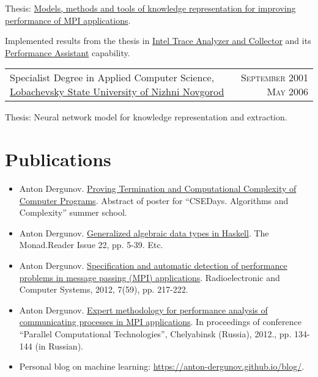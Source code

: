 \documentclass{article}
\makeatletter
\newcommand{\whatwherewhen}[3]{
\noindent\begin{tabular*}{\columnwidth}{@{}@{\extracolsep{\fill}}lr@{}}
#1, #2 & \textsc{#3}
\end{tabular*}}
\newcommand{\smallvskip}{\vskip2mm}
\makeatother
\begin{document}
Thesis: \href{https://search.rsl.ru/ru/record/01005013870}{Models, methods and tools of knowledge representation for improving performance of MPI applications}. 

Implemented results from the thesis in \href{http://software.intel.com/en-us/intel-trace-analyzer}{Intel Trace Analyzer and Collector} and its \href{https://web.archive.org/web/20151022144828/https://software.intel.com/en-us/node/561522}{Performance Assistant} capability.

\smallvskip
\whatwherewhen{Specialist Degree in Applied Computer Science}{\href{http://unn.ru}{Lobachevsky State University of Nizhni Novgorod}}{September 2001 \textendash{} May 2006}

Thesis: Neural network model for knowledge representation and extraction.


\section{Publications}

\begin{itemize}
\item Anton Dergunov. \href{http://anton-dergunov.github.io/publications/proving_complexity_v2.pdf}{Proving Termination and Computational Complexity of Computer Programs}. Abstract of poster for ``CSEDays. Algorithms and Complexity'' summer school.
\item Anton Dergunov. \href{http://themonadreader.files.wordpress.com/2013/08/issue221.pdf}{Generalized algebraic data types in Haskell}. The Monad.Reader Issue 22, pp. 5-39. Etc.
\item Anton Dergunov. \href{http://anton-dergunov.ru/publications/mpi_performance.pdf}{Specification and automatic detection of performance problems in message passing (MPI) applications}. Radioelectronic and Computer Systems, 2012, 7(59), pp. 217-222.
\item Anton Dergunov. \href{https://anton-dergunov.github.io/publications/expert_methodology.pdf}{Expert methodology for performance analysis of communicating processes in MPI applications}. In proceedings of conference ``Parallel Computational Technologies'', Chelyabinsk (Russia), 2012., pp. 134-144 (in Russian).
\item Personal blog on machine learning: \href{https://anton-dergunov.github.io/blog/}{https://anton-dergunov.github.io/blog/}.

\end{itemize}
\end{document}
